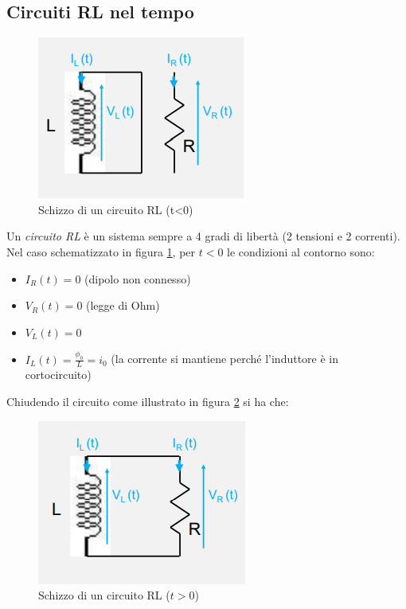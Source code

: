 \documentclass{article}
\begin{document}
\subsection{Circuiti RL nel tempo}

\begin{figure}[h]
  \centering
  \includegraphics[scale=0.7]{IM_circuito_RL}
  \caption{Schizzo di un circuito RL (t<0)}
  \label{Schema_circuito_RL}
\end{figure}

Un \textit{circuito RL} è un sistema sempre a 4 gradi di libertà (2 tensioni e 2 correnti). Nel caso schematizzato in figura \ref{Schema_circuito_RL}, per $t<0$ le condizioni al contorno sono:

\begin{itemize}
  \item $I_R (t) = 0$ (dipolo non connesso)
  \item $V_R (t) = 0$ (legge di Ohm)
  \item $V_L (t) = 0$
  \item $I_L (t) = \frac{\phi _0}{L} = i_0$ (la corrente si mantiene perché l'induttore è in cortocircuito)
\end{itemize}
\newpage
Chiudendo il circuito come illustrato in figura \ref{Schema_circuito_RL_chiuso} si ha che:

\begin{figure}[h]
  \centering
  \includegraphics[scale=0.7]{IM_circuito_RL_chiuso}
  \caption{Schizzo di un circuito RL ($t>0$)}
  \label{Schema_circuito_RL_chiuso}
\end{figure}
\end{document}
